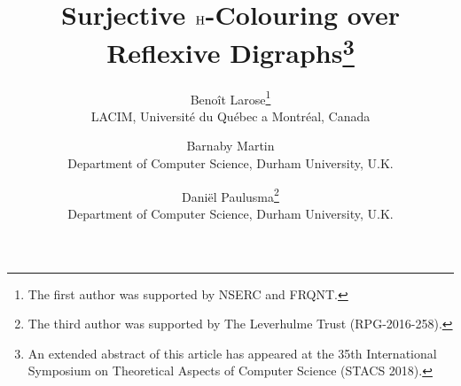 \documentclass[a4paper,12pt]{article}
\theoremstyle{remark}
\renewcommand{\H}{\ensuremath{\mathrm{H}}}
\begin{document}
 
\title{Surjective ${\mathbf \H}$-Colouring over Reflexive Digraphs\thanks{An extended abstract of this article has appeared at the 35th International Symposium on Theoretical Aspects of Computer Science (STACS 2018).
}}


\author{
Beno\^it Larose\thanks{The first author was supported by NSERC and FRQNT.} \\
LACIM, Universit\'e du Qu\'ebec a Montr\'eal, Canada
\and
Barnaby Martin \\
Department of Computer Science, Durham University, U.K.
\and
Dani\"el Paulusma\thanks{The third author was supported by The Leverhulme Trust (RPG-2016-258).} \\
Department of Computer Science, Durham University, U.K.
}





\maketitle
\end{document}
